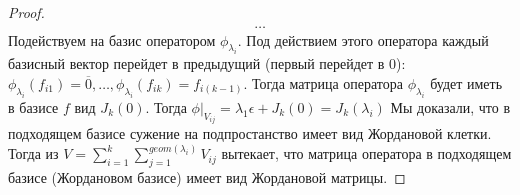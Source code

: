 \begin{proof}
\begin{gather*}
        \dots
    \end{gather*}
    Подействуем на базис оператором $\phi_{\lambda_i}$. Под действием этого оператора каждый базисный 
    вектор перейдет в предыдущий (первый перейдет в $0$): $\phi_{\lambda_i}(f_{i1}) = \overline{0}, \dots, \phi_{\lambda_i}(f_{ik}) = f_{i(k - 1)}$. 
    Тогда матрица оператора $\phi_{\lambda_i}$ будет иметь в базисе $f$ вид $J_k(0)$.
    Тогда $\phi \vert_{V_{ij}} = \lambda_1 \epsilon + J_k(0) = J_k(\lambda_i)$
    Мы доказали, что в подходящем базисе сужение на подпростанство имеет вид Жордановой клетки. Тогда из
    $V = \displaystyle\sum_{i = 1}^{k} \displaystyle\sum_{j = 1}^{geom(\lambda_i)} V_{ij}$
    вытекает, что матрица оператора в подходящем базисе (Жордановом базисе) имеет вид Жордановой матрицы.
\end{proof}